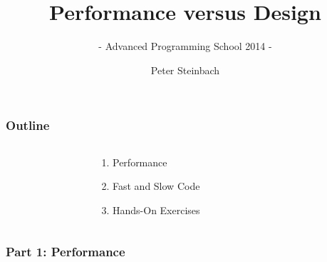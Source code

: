 \documentclass[9pt,xcolor=table]{beamer}
\begin{document}
     
 
 
\title[PerfVsDesign]{Performance versus Design}
\subtitle{- Advanced Programming School 2014 -}
\author[P. Steinbach]{Peter Steinbach}
\date{}
\addtocounter{framenumber}{-1}
\renewcommand*\inserttotalframenumber{52} 

 
{
\maketitle
}

\begin{frame}[t]
\frametitle{Outline}
\vspace{-1.5\baselineskip}

  \begin{columns}[t]
    \begin{column}{.1\textwidth}
      \hfill
    \end{column}
    \begin{column}{.75\textwidth}
      \huge
      \begin{enumerate}
      \item Performance
      \item Fast and Slow Code
      \item Hands-On Exercises
      \end{enumerate}
    \end{column}
    \begin{column}{.1\textwidth}
      \hfill
    \end{column}
  \end{columns}

\end{frame}

\begin{frame}[t]
\frametitle{Part 1: Performance}
\vspace{-1.5\baselineskip}

  \begin{columns}[t]
    \begin{column}{.1\textwidth}
      \hfill
    \end{column}
    \begin{column}{.75\textwidth}
      \huge
      \tableofcontents[hideallsubsections]
    \end{column}
    \begin{column}{.1\textwidth}
      \hfill
    \end{column}
  \end{columns}

\end{frame}
\end{document}
